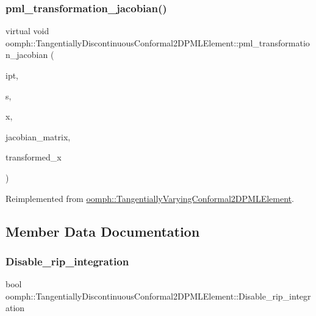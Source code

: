 \subsubsection{\texorpdfstring{pml\+\_\+transformation\+\_\+jacobian()}{pml\_transformation\_jacobian()}\hspace{0.1cm}{\footnotesize\ttfamily [2/2]}}
{\footnotesize\ttfamily virtual void oomph\+::\+Tangentially\+Discontinuous\+Conformal2\+D\+P\+M\+L\+Element\+::pml\+\_\+transformation\+\_\+jacobian (\begin{DoxyParamCaption}\item[{const unsigned \&}]{ipt,  }\item[{const \hyperlink{classoomph_1_1Vector}{Vector}$<$ double $>$ \&}]{s,  }\item[{const \hyperlink{classoomph_1_1Vector}{Vector}$<$ double $>$ \&}]{x,  }\item[{\hyperlink{classoomph_1_1DenseComplexMatrix}{Dense\+Complex\+Matrix} \&}]{jacobian\+\_\+matrix,  }\item[{\hyperlink{classoomph_1_1Vector}{Vector}$<$ std\+::complex$<$ double $>$ $>$ \&}]{transformed\+\_\+x }\end{DoxyParamCaption})\hspace{0.3cm}{\ttfamily [virtual]}}



Reimplemented from \hyperlink{classoomph_1_1TangentiallyVaryingConformal2DPMLElement_a56a6af4af3774579d49d9dcc8c7e9bea}{oomph\+::\+Tangentially\+Varying\+Conformal2\+D\+P\+M\+L\+Element}.



\subsection{Member Data Documentation}
\mbox{\label{classoomph_1_1TangentiallyDiscontinuousConformal2DPMLElement_a9dea74889c96ed8eb7c494e93afc6093}} 
\subsubsection{\texorpdfstring{Disable\+\_\+rip\+\_\+integration}{Disable\_rip\_integration}}
{\footnotesize\ttfamily bool oomph\+::\+Tangentially\+Discontinuous\+Conformal2\+D\+P\+M\+L\+Element\+::\+Disable\+\_\+rip\+\_\+integration\hspace{0.3cm}{\ttfamily [protected]}}



